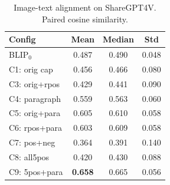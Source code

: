 \begin{table}[t]
\centering
\caption{Image-text alignment on ShareGPT4V. Paired cosine similarity.}
\label{tab:align_sharegpt4v}
\small
\begin{tabular}{lccc}
\toprule
\textbf{Config} & \textbf{Mean} & \textbf{Median} & \textbf{Std} \\
\midrule
BLIP$_0$ & 0.487 & 0.490 & 0.048 \\
\midrule
C1: orig cap & 0.456 & 0.466 & 0.080 \\
C3: orig+rpos & 0.429 & 0.441 & 0.090 \\
C4: paragraph & 0.559 & 0.563 & 0.060 \\
C5: orig+para & 0.605 & 0.610 & 0.058 \\
C6: rpos+para & 0.603 & 0.609 & 0.058 \\
C7: pos+neg & 0.364 & 0.391 & 0.140 \\
C8: all5pos & 0.420 & 0.430 & 0.088 \\
C9: 5pos+para & \textbf{0.658} & 0.665 & 0.056 \\
\bottomrule
\end{tabular}
\end{table}
